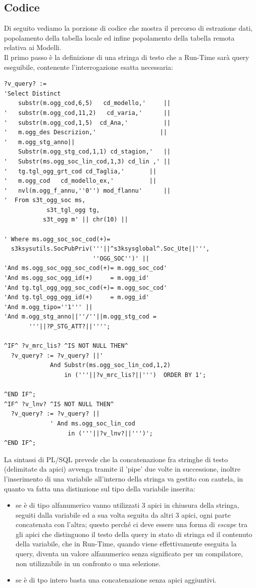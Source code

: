 \subsection{Codice}
Di seguito vediamo la porzione di codice che mostra il percorso di estrazione dati, popolamento della tabella locale ed infine popolamento della tabella remota relativa ai Modelli.\\
Il primo passo è la definizione di una stringa di testo che a Run-Time sarà query eseguibile, contenente l'interrogazione esatta necessaria:
\begin{lstlisting}[frame=single, style=base]
?v_query? := 
'Select Distinct 
    substr(m.ogg_cod,6,5)   cd_modello,'     || 
'   substr(m.ogg_cod,11,2)   cd_varia,'      ||
'   substr(m.ogg_cod,1,5)  cd_Ana,'          || 
'   m.ogg_des Descrizion,'                  || 
'   m.ogg_stg_anno||
    Substr(m.ogg_stg_cod,1,1) cd_stagion,'   ||
'   Substr(ms.ogg_soc_lin_cod,1,3) cd_lin ,' || 
'   tg.tgl_ogg_grt_cod cd_Taglia,' 	     || 
'   m.ogg_cod   cd_modello_ex,' 	     || 
'   nvl(m.ogg_f_annu,''0'') mod_flannu'      ||
'  From s3t_ogg_soc ms,
            s3t_tgl_ogg tg, 
           s3t_ogg m' || chr(10) ||

' Where ms.ogg_soc_soc_cod(+)=
  s3ksysutils.SocPubPriv('''||^s3ksysglobal^.Soc_Ute||''',
                         ''OGG_SOC'')' || 
'And ms.ogg_soc_ogg_soc_cod(+)= m.ogg_soc_cod' 
'And ms.ogg_soc_ogg_id(+)     = m.ogg_id' 
'And tg.tgl_ogg_ogg_soc_cod(+)= m.ogg_soc_cod' 
'And tg.tgl_ogg_ogg_id(+)     = m.ogg_id' 
'And m.ogg_tipo=''1''' ||
'And m.ogg_stg_anno||''/''||m.ogg_stg_cod =
       '''||?P_STG_ATT?||'''';

^IF^ ?v_mrc_lis? ^IS NOT NULL THEN^
  ?v_query? := ?v_query? ||'
             And Substr(ms.ogg_soc_lin_cod,1,2)
                 in ('''||?v_mrc_lis?||''')  ORDER BY 1';

^END IF^;
^IF^ ?v_lnv? ^IS NOT NULL THEN^
  ?v_query? := ?v_query? ||
             ' And ms.ogg_soc_lin_cod 
                  in ('''||?v_lnv?||''')';  
^END IF^;
\end{lstlisting}
La sintassi di PL/SQL prevede che la concatenazione fra stringhe di testo (delimitate da apici) avvenga tramite il 'pipe' due volte in successione, inoltre l'inserimento di una variabile all'interno della stringa va gestito con cautela, in quanto va fatta una distinzione sul tipo della variabile inserita: \\
\begin{itemize}
\item se è di tipo alfanumerico vanno utilizzati 3 apici in chiusura della stringa, seguiti dalla variabile ed a sua volta seguita da altri 3 apici, ogni parte concatenata con l'altra; questo perché ci deve essere una forma di \textit{escape} tra gli apici che distinguono il testo della query in stato di stringa ed il contenuto della variabile, che in Run-Time, quando viene effettivamente eseguita la query, diventa un valore alfanumerico senza significato per un compilatore, non utilizzabile in un confronto o una selezione.\\
\item se è di tpo intero basta una concatenazione senza apici aggiuntivi.
\end{itemize}
